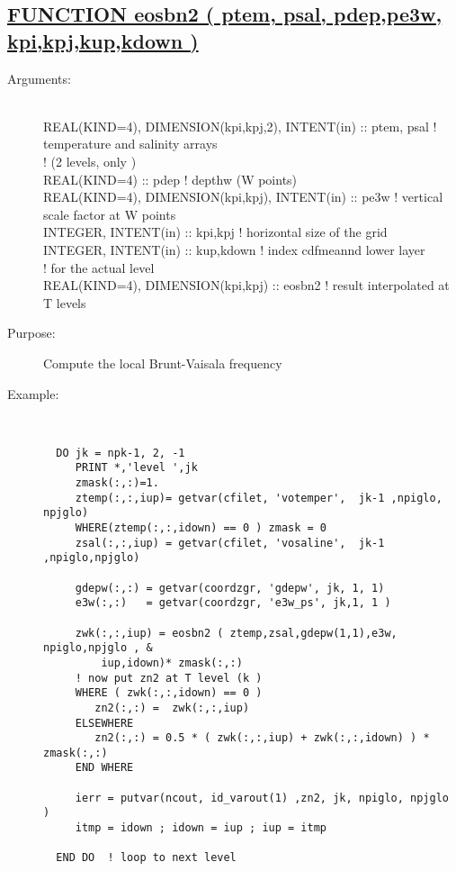 \documentclass[a4paper,11pt]{article}
\begin{document}
\newpage

\subsection*{\underline{FUNCTION eosbn2 ( ptem, psal, pdep,pe3w, kpi,kpj,kup,kdown )}}
\begin{description}
\item[Arguments:] \ \\
       REAL(KIND=4), DIMENSION(kpi,kpj,2), INTENT(in) :: ptem, psal ! temperature and salinity arrays \\
                                                                    ! (2 levels, only ) \\
       REAL(KIND=4)                                   :: pdep       ! depthw (W points) \\
       REAL(KIND=4), DIMENSION(kpi,kpj), INTENT(in) ::  pe3w        ! vertical scale factor at W points \\
       INTEGER, INTENT(in)    :: kpi,kpj                            ! horizontal size of the grid \\
       INTEGER, INTENT(in)    :: kup,kdown                          ! index cdfmeannd lower layer \\
                                                                    ! for the actual level \\
       REAL(KIND=4), DIMENSION(kpi,kpj) :: eosbn2                   ! result  interpolated at T levels

\item[Purpose:]  Compute the local Brunt-Vaisala frequency 
\item[Example:]\ \\
\begin{verbatim}
  DO jk = npk-1, 2, -1
     PRINT *,'level ',jk
     zmask(:,:)=1.
     ztemp(:,:,iup)= getvar(cfilet, 'votemper',  jk-1 ,npiglo, npjglo)
     WHERE(ztemp(:,:,idown) == 0 ) zmask = 0
     zsal(:,:,iup) = getvar(cfilet, 'vosaline',  jk-1 ,npiglo,npjglo)

     gdepw(:,:) = getvar(coordzgr, 'gdepw', jk, 1, 1)
     e3w(:,:)   = getvar(coordzgr, 'e3w_ps', jk,1, 1 )

     zwk(:,:,iup) = eosbn2 ( ztemp,zsal,gdepw(1,1),e3w, npiglo,npjglo , &
         iup,idown)* zmask(:,:)
     ! now put zn2 at T level (k )
     WHERE ( zwk(:,:,idown) == 0 )
        zn2(:,:) =  zwk(:,:,iup)
     ELSEWHERE
        zn2(:,:) = 0.5 * ( zwk(:,:,iup) + zwk(:,:,idown) ) * zmask(:,:)
     END WHERE

     ierr = putvar(ncout, id_varout(1) ,zn2, jk, npiglo, npjglo )
     itmp = idown ; idown = iup ; iup = itmp

  END DO  ! loop to next level

\end{verbatim}
\end{description}
\end{document}
